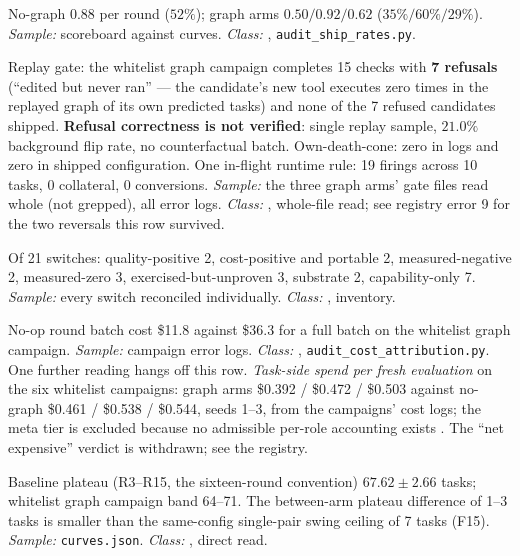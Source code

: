 \begin{description}[leftmargin=0pt,style=nextline,font=\normalfont,itemsep=6pt]
\item[\textbf{F10}\quad Ship rate.]
No-graph $0.88$ per round ($52\%$); graph arms $0.50/0.92/0.62$
($35\%/60\%/29\%$). \emph{Sample:} scoreboard against curves.
\emph{Class:} , \texttt{audit\_ship\_rates.py}.

\item[\textbf{F11}\quad Live record of the graph-only mechanisms.]
Replay gate: the whitelist graph campaign completes 15 checks
with \textbf{7 refusals} (``edited but never ran'' --- the candidate's new
tool executes zero times in the replayed graph of its own predicted tasks)
and none of the 7 refused candidates shipped. \textbf{Refusal correctness
is not verified}: single replay sample, $21.0\%$ background flip rate, no
counterfactual batch. Own-death-cone: zero in logs and zero in shipped
configuration. One in-flight runtime rule: 19 firings across 10 tasks, 0
collateral, 0 conversions. \emph{Sample:} the three graph arms' gate files
read whole (not grepped), all error logs. \emph{Class:} ,
whole-file read; see registry error 9 for the two reversals this row
survived.

\item[\textbf{F12}\quad Switch profit-and-loss.]
Of 21 switches: quality-positive 2, cost-positive and portable 2,
measured-negative 2, measured-zero 3, exercised-but-unproven 3, substrate
2, capability-only 7. \emph{Sample:} every switch reconciled individually.
\emph{Class:} , inventory.

\item[\textbf{F13}\quad Cost attribution.]
No-op round batch cost \$11.8 against \$36.3 for a full batch on the
whitelist graph campaign. \emph{Sample:} campaign error logs.
\emph{Class:} , \texttt{audit\_cost\_attribution.py}. One
further reading hangs off this row. \emph{Task-side spend per fresh
evaluation} on the six whitelist campaigns: graph arms
\$0.392 / \$0.472 / \$0.503 against no-graph \$0.461 / \$0.538 /
\$0.544, seeds 1--3, from the campaigns' cost logs; the meta tier is
excluded because no admissible per-role accounting exists .
The ``net expensive'' verdict is withdrawn; see the registry.

\item[\textbf{F14}\quad Terminal scores do not separate.]
Baseline plateau (R3--R15, the sixteen-round convention)
$\mathbf{67.62 \pm 2.66}$ tasks; whitelist graph campaign band 64--71.
The between-arm plateau difference of 1--3 tasks is smaller than the
same-config single-pair swing ceiling of 7 tasks (F15). \emph{Sample:}
\texttt{curves.json}. \emph{Class:} , direct read.


\end{description}
